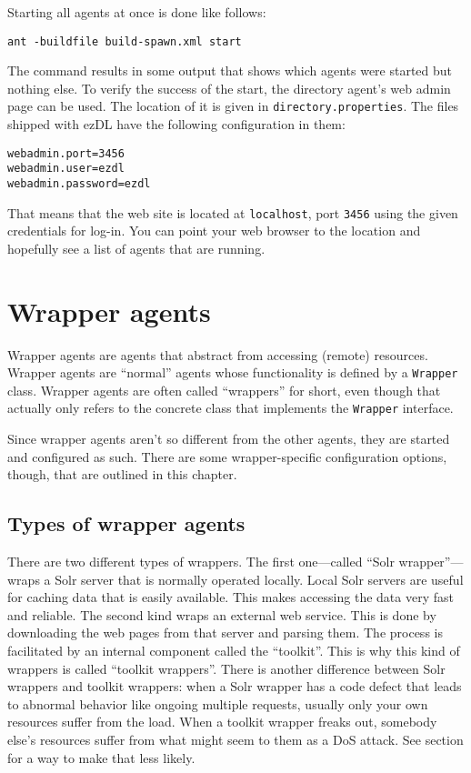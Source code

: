 \documentclass[12pt]{book}
\begin{document}
Starting all agents at once is done like follows:

\begin{verbatim}
ant -buildfile build-spawn.xml start
\end{verbatim}

The command results in some output that shows which agents were started but nothing else. To verify the success of the start, the directory agent's web admin page can be used. The location of it is given in {\tt directory.properties}. The files shipped with ezDL have the following configuration in them:

\begin{verbatim}
webadmin.port=3456
webadmin.user=ezdl
webadmin.password=ezdl
\end{verbatim}

That means that the web site is located at {\tt localhost}, port {\tt 3456} using the given credentials for log-in. You can point your web browser to the location and hopefully see a list of agents that are running.



\chapter{Wrapper agents}

Wrapper agents are agents that abstract from accessing (remote) resources. Wrapper agents are "`normal"' agents whose functionality is defined by a {\tt Wrapper} class. Wrapper agents are often called "`wrappers"' for short, even though that actually only refers to the concrete class that implements the {\tt Wrapper} interface.

Since wrapper agents aren't so different from the other agents, they are started and configured as such. There are some wrapper-specific configuration options, though, that are outlined in this chapter.



\section{Types of wrapper agents}

There are two different types of wrappers. The first one---called ``Solr wrapper''---wraps a Solr server that is normally operated locally. Local Solr servers are useful for caching data that is easily available. This makes accessing the data very fast and reliable. The second kind wraps an external web service. This is done by downloading the web pages from that server and parsing them. The process is facilitated by an internal component called the ``toolkit''. This is why this kind of wrappers is called ``toolkit wrappers''.
There is another difference between Solr wrappers and toolkit wrappers: when a Solr wrapper has a code defect that leads to abnormal behavior like ongoing multiple requests, usually only your own resources suffer from the load. When a toolkit wrapper freaks out, somebody else's resources suffer from what might seem to them as a DoS attack. See section  for a way to make that less likely.
\end{document}

